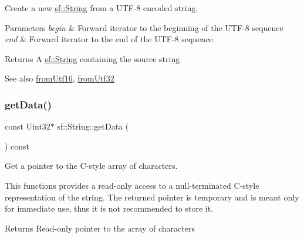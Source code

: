 Create a new \mbox{\hyperlink{classsf_1_1_string}{sf\+::\+String}} from a U\+T\+F-\/8 encoded string. 


\begin{DoxyParams}{Parameters}
{\em begin} & Forward iterator to the beginning of the U\+T\+F-\/8 sequence \\
\hline
{\em end} & Forward iterator to the end of the U\+T\+F-\/8 sequence\\
\hline
\end{DoxyParams}
\begin{DoxyReturn}{Returns}
A \mbox{\hyperlink{classsf_1_1_string}{sf\+::\+String}} containing the source string
\end{DoxyReturn}
\begin{DoxySeeAlso}{See also}
\mbox{\hyperlink{classsf_1_1_string_a81f70eecad0000a4f2e4d66f97b80300}{from\+Utf16}}, \mbox{\hyperlink{classsf_1_1_string_ab023a4900dce37ee71ab9e29b30a23cb}{from\+Utf32}} \begin{DoxyVerb}\end{DoxyVerb}
 
\end{DoxySeeAlso}
\mbox{\label{classsf_1_1_string_a0b38001f1a6b7bdf35bb180da5391929}} 
\subsubsection{\texorpdfstring{getData()}{getData()}}
{\footnotesize\ttfamily const Uint32$\ast$ sf\+::\+String\+::get\+Data (\begin{DoxyParamCaption}{ }\end{DoxyParamCaption}) const}



Get a pointer to the C-\/style array of characters. 

This functions provides a read-\/only access to a null-\/terminated C-\/style representation of the string. The returned pointer is temporary and is meant only for immediate use, thus it is not recommended to store it.

\begin{DoxyReturn}{Returns}
Read-\/only pointer to the array of characters \begin{DoxyVerb}\end{DoxyVerb}
 
\end{DoxyReturn}
\mbox{\label{classsf_1_1_string_ae7aff54e178f5d3e399953adff5cad20}} 
